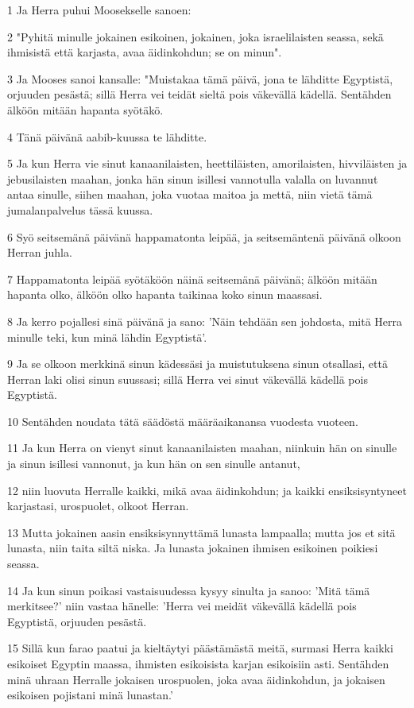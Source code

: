 \par 1 Ja Herra puhui Moosekselle sanoen:
\par 2 "Pyhitä minulle jokainen esikoinen, jokainen, joka israelilaisten seassa, sekä ihmisistä että karjasta, avaa äidinkohdun; se on minun".
\par 3 Ja Mooses sanoi kansalle: "Muistakaa tämä päivä, jona te lähditte Egyptistä, orjuuden pesästä; sillä Herra vei teidät sieltä pois väkevällä kädellä. Sentähden älköön mitään hapanta syötäkö.
\par 4 Tänä päivänä aabib-kuussa te lähditte.
\par 5 Ja kun Herra vie sinut kanaanilaisten, heettiläisten, amorilaisten, hivviläisten ja jebusilaisten maahan, jonka hän sinun isillesi vannotulla valalla on luvannut antaa sinulle, siihen maahan, joka vuotaa maitoa ja mettä, niin vietä tämä jumalanpalvelus tässä kuussa.
\par 6 Syö seitsemänä päivänä happamatonta leipää, ja seitsemäntenä päivänä olkoon Herran juhla.
\par 7 Happamatonta leipää syötäköön näinä seitsemänä päivänä; älköön mitään hapanta olko, älköön olko hapanta taikinaa koko sinun maassasi.
\par 8 Ja kerro pojallesi sinä päivänä ja sano: 'Näin tehdään sen johdosta, mitä Herra minulle teki, kun minä lähdin Egyptistä'.
\par 9 Ja se olkoon merkkinä sinun kädessäsi ja muistutuksena sinun otsallasi, että Herran laki olisi sinun suussasi; sillä Herra vei sinut väkevällä kädellä pois Egyptistä.
\par 10 Sentähden noudata tätä säädöstä määräaikanansa vuodesta vuoteen.
\par 11 Ja kun Herra on vienyt sinut kanaanilaisten maahan, niinkuin hän on sinulle ja sinun isillesi vannonut, ja kun hän on sen sinulle antanut,
\par 12 niin luovuta Herralle kaikki, mikä avaa äidinkohdun; ja kaikki ensiksisyntyneet karjastasi, urospuolet, olkoot Herran.
\par 13 Mutta jokainen aasin ensiksisynnyttämä lunasta lampaalla; mutta jos et sitä lunasta, niin taita siltä niska. Ja lunasta jokainen ihmisen esikoinen poikiesi seassa.
\par 14 Ja kun sinun poikasi vastaisuudessa kysyy sinulta ja sanoo: 'Mitä tämä merkitsee?' niin vastaa hänelle: 'Herra vei meidät väkevällä kädellä pois Egyptistä, orjuuden pesästä.
\par 15 Sillä kun farao paatui ja kieltäytyi päästämästä meitä, surmasi Herra kaikki esikoiset Egyptin maassa, ihmisten esikoisista karjan esikoisiin asti. Sentähden minä uhraan Herralle jokaisen urospuolen, joka avaa äidinkohdun, ja jokaisen esikoisen pojistani minä lunastan.'
